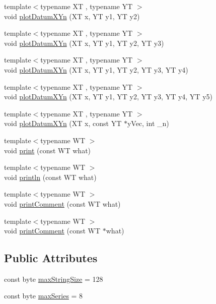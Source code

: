 \begin{DoxyCompactItemize}
\item 
{\footnotesize template$<$typename X\+T , typename Y\+T $>$ }\\void \hyperlink{class_serial_graph_a79b721ca2be68969862869f96d6a6305}{plot\+Datum\+X\+Yn} (X\+T x, Y\+T y1, Y\+T y2)
\item 
{\footnotesize template$<$typename X\+T , typename Y\+T $>$ }\\void \hyperlink{class_serial_graph_a9fcea879f299a7d24be4ff9a38c53c26}{plot\+Datum\+X\+Yn} (X\+T x, Y\+T y1, Y\+T y2, Y\+T y3)
\item 
{\footnotesize template$<$typename X\+T , typename Y\+T $>$ }\\void \hyperlink{class_serial_graph_afd854b631604abe2014a1bb1beeeec52}{plot\+Datum\+X\+Yn} (X\+T x, Y\+T y1, Y\+T y2, Y\+T y3, Y\+T y4)
\item 
{\footnotesize template$<$typename X\+T , typename Y\+T $>$ }\\void \hyperlink{class_serial_graph_aa1bb6fa08a8bd06c074ac2a02b3f6fbc}{plot\+Datum\+X\+Yn} (X\+T x, Y\+T y1, Y\+T y2, Y\+T y3, Y\+T y4, Y\+T y5)
\item 
{\footnotesize template$<$typename X\+T , typename Y\+T $>$ }\\void \hyperlink{class_serial_graph_a3d7276c89235dc1aa176e2439ad9835b}{plot\+Datum\+X\+Yn} (X\+T x, const Y\+T $\ast$y\+Vec, int \+\_\+n)
\item 
{\footnotesize template$<$typename W\+T $>$ }\\void \hyperlink{class_serial_graph_aa72b48968e82a953dcdc6522bd04c7b4}{print} (const W\+T what)
\item 
{\footnotesize template$<$typename W\+T $>$ }\\void \hyperlink{class_serial_graph_a2005d103cb5a578053ef7838b3a8422d}{println} (const W\+T what)
\item 
{\footnotesize template$<$typename W\+T $>$ }\\void \hyperlink{class_serial_graph_a7237d928f67a14d5c9950d8c23c2a794}{print\+Comment} (const W\+T what)
\item 
{\footnotesize template$<$typename W\+T $>$ }\\void \hyperlink{class_serial_graph_a9b40aa22335fc26a6c29b16d278b26f8}{print\+Comment} (const W\+T $\ast$what)
\end{DoxyCompactItemize}
\subsection*{Public Attributes}
\begin{DoxyCompactItemize}
\item 
const byte \hyperlink{class_serial_graph_a1867ab3a93268646490fa7ba4f8b5680}{max\+String\+Size} = 128
\item 
const byte \hyperlink{class_serial_graph_a752a1429bd35687163fe11c5a2562bef}{max\+Series} = 8
\end{DoxyCompactItemize}
